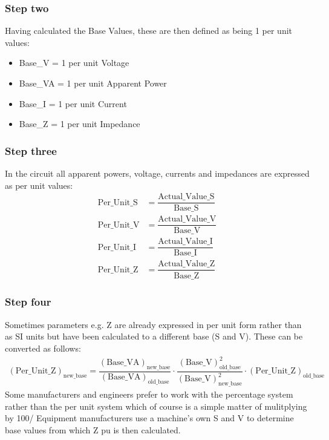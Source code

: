 \subsubsection{Step two}
Having calculated the Base Values, these are then defined as being 1 per unit values:
\begin{itemize}
	\item Base\_V = 1 per unit Voltage
	\item Base\_VA = 1 per unit Apparent Power
	\item Base\_I = 1 per unit Current
	\item Base\_Z = 1 per unit Impedance
\end{itemize}
\subsubsection{Step three}
In the circuit all apparent powers, voltage, currents and impedances are expressed as per unit values:
\begin{align}
	\textrm{Per\_Unit\_S} & = \dfrac{\textrm{Actual\_Value\_S}}{\textrm{Base\_S}} \\
	\textrm{Per\_Unit\_V} & = \dfrac{\textrm{Actual\_Value\_V}}{\textrm{Base\_V}} \\
	\textrm{Per\_Unit\_I} & = \dfrac{\textrm{Actual\_Value\_I}}{\textrm{Base\_I}} \\
	\textrm{Per\_Unit\_Z} & = \dfrac{\textrm{Actual\_Value\_Z}}{\textrm{Base\_Z}}
\end{align}
\subsubsection{Step four}
Sometimes parameters e.g. Z are already expressed in per unit form rather than as SI units but have been calculated to a different base (S and V). These can be converted as follows:
\begin{gather}
	\left(\textrm{Per\_Unit\_Z}\right)_{\textrm{new\_base}} = \dfrac{\left(\textrm{Base\_VA}\right)_{\textrm{new\_base}}}{\left(\textrm{Base\_VA}\right)_{\textrm{old\_base}}} \cdot \dfrac{\left(\textrm{Base\_V}\right)^2_{\textrm{old\_base}}}{\left(\textrm{Base\_V}\right)^2_{\textrm{new\_base}}} \cdot \left(\textrm{Per\_Unit\_Z}\right)_{\textrm{old\_base}}
\end{gather}
Some manufacturers and engineers prefer to work with the percentage system rather than the per unit system which of course is a simple matter of mulitplying by 100/ Equipment manufacturers use a machine's own S and V to determine base values from which Z pu is then calculated.
